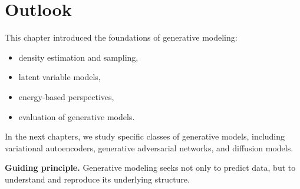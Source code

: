 \section{Outlook}

This chapter introduced the foundations of generative modeling:
\begin{itemize}
    \item density estimation and sampling,
    \item latent variable models,
    \item energy-based perspectives,
    \item evaluation of generative models.
\end{itemize}

\medskip

In the next chapters, we study specific classes of generative models, including variational autoencoders, generative adversarial networks, and diffusion models.

\medskip

\noindent
\textbf{Guiding principle.}  
Generative modeling seeks not only to predict data, but to understand and reproduce its underlying structure.
